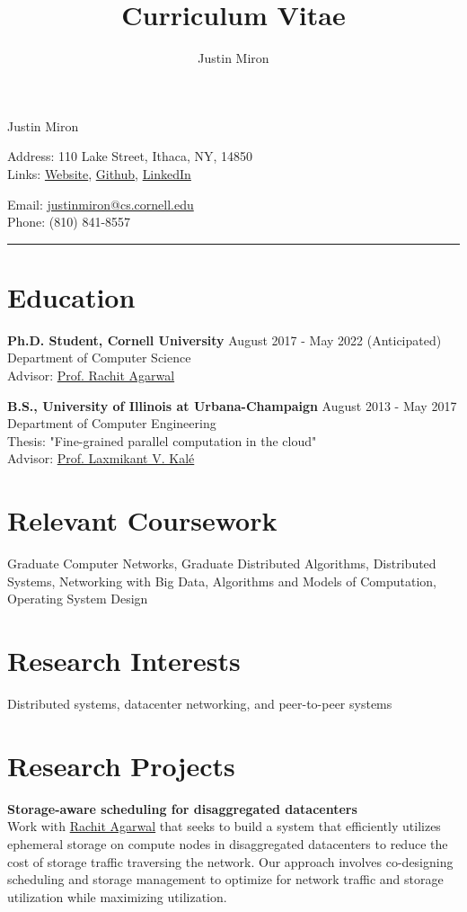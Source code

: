 \documentclass[10pt]{article}
\title{Curriculum Vitae}
\author{Justin Miron}
\makeatletter
\newcommand{\Hrule}{\par\rule{\linewidth}{0.3mm}}
\newcommand{\leftrightrow}[2]{
	#1 \hfill #2 \\
}
\newcommand{\titlesection}{
\parindent=0pt
\setlength{\parskip}{0.1em}

\par{\begin{center}\LARGE Justin Miron\end{center}}

\begin{minipage}[t]{0.40\textwidth}
Address: 110 Lake Street, Ithaca, NY, 14850 \\
Links: \href{http://justinmiron.com}{Website}, \href{https://github.com/jmiron11}{Github}, \href{https://www.linkedin.com/in/justinmiron/}{LinkedIn}
\end{minipage}
\hfill
\begin{minipage}[t]{0.40\textwidth}
Email: \href{mailto:justinmiron@cs.cornell.edu}{justinmiron@cs.cornell.edu} \\
Phone: (810) 841-8557
\end{minipage}
\vspace{0.3em}
\Hrule
}
\newcommand{\researchblock}[3]{
	\leftrightrow{\textbf{#1}}{#2}#3
}
\newcommand{\educationblock}[3]{
	\leftrightrow{\textbf{#1}}{#2}
    #3
}
\makeatother
\begin{document}
\titlesection
\setlength{\parskip}{0em}

\section{Education}
\vspace{0.1em}
\educationblock{Ph.D. Student, Cornell University}{August 2017 - May 2022 (Anticipated)}{Department of Computer Science \\
Advisor: \href{http://www.cs.cornell.edu/~ragarwal/}{Prof. Rachit Agarwal}}
\vspace{0.5em}

\educationblock{B.S., University of Illinois at Urbana-Champaign}{August 2013 - May 2017}{Department of Computer Engineering \\
Thesis: "Fine-grained parallel computation in the cloud" \\
Advisor: \href{http://charm.cs.uiuc.edu/~kale/}{Prof. Laxmikant V. Kal\'e}}

\section{Relevant Coursework}
\vspace{0.1em}
Graduate Computer Networks, Graduate Distributed Algorithms, Distributed Systems, Networking with Big Data, Algorithms and Models of Computation, Operating System Design

\section{Research Interests}
\vspace{0.1em}
Distributed systems, datacenter networking, and peer-to-peer systems

\section{Research Projects}
\vspace{0.1em}
\researchblock{Storage-aware scheduling for disaggregated datacenters}{}
{
	Work with \href{http://www.cs.cornell.edu/~ragarwal/}{Rachit Agarwal} that seeks to build a system that efficiently utilizes ephemeral storage on compute nodes in disaggregated datacenters to reduce the cost of storage traffic traversing the network. Our approach involves co-designing scheduling and storage management to optimize for network traffic and storage utilization while maximizing utilization.
}
\end{document}
